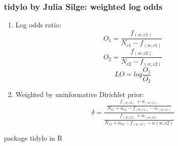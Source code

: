 \documentclass[svgnames]{beamer}
\begin{document}
\begin{frame}
  \frametitle{tidylo by Julia Silge: weighted log odds}
  \begin{enumerate}
  \item Log odds ratio:
    $$
    O_1 = \frac{f_{(w,c1)}}{N_{c1}-f_{(w,c1)}}
    $$
    $$
    O_2 = \frac{f_{(w,c2)}}{N_{c2}-f_{(w,c2)}}
    $$
    $$
    LO = log \frac{O_1}{O_2}
    $$
  \item Weighted by uninformative Dirichlet prior:
    $$
    \delta =
    \frac{\frac{f_{(w,c1)}+\alpha_{(w,c1)}}{N_{c1}+\alpha_{c1}-f_{(w,c1)}-\alpha_{(w,c1)}}}{\frac{f_{(w,c2)}+\alpha_{(w,c2)}}{N_{c2}+\alpha_{c2}-f_{(w,c2)}-\alpha{(w,c2)}}}
    $$
  \end{enumerate}

  package tidylo in R
\end{frame}
\end{document}
